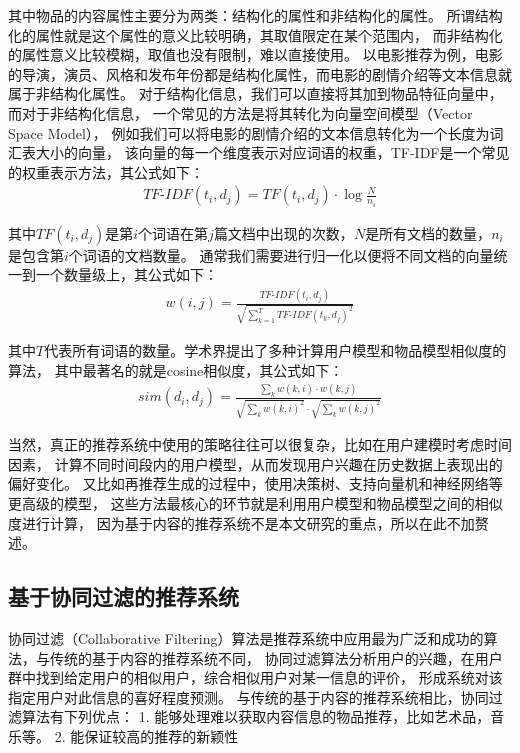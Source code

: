 其中物品的内容属性主要分为两类：结构化的属性和非结构化的属性。
所谓结构化的属性就是这个属性的意义比较明确，其取值限定在某个范围内，
而非结构化的属性意义比较模糊，取值也没有限制，难以直接使用。
以电影推荐为例，电影的导演，演员、风格和发布年份都是结构化属性，而电影的剧情介绍等文本信息就属于非结构化属性。
对于结构化信息，我们可以直接将其加到物品特征向量中，而对于非结构化信息，
一个常见的方法是将其转化为向量空间模型（Vector Space Model），
例如我们可以将电影的剧情介绍的文本信息转化为一个长度为词汇表大小的向量，
该向量的每一个维度表示对应词语的权重，TF-IDF是一个常见的权重表示方法，其公式如下：
\begin{equation}
\begin{split}
TF\textrm{-}IDF(t_i, d_j) = TF(t_i, d_j) \cdot \log{ \frac{N}{n_i} }
\end{split}
\end{equation}

其中$TF(t_i, d_j)$是第$i$个词语在第$j$篇文档中出现的次数，$N$是所有文档的数量，$n_i$是包含第$i$个词语的文档数量。
通常我们需要进行归一化以便将不同文档的向量统一到一个数量级上，其公式如下：
\begin{equation}
\begin{split}
w(i, j) = \frac{ TF\textrm{-}IDF(t_i, d_j) }{ \sqrt{\sum_{k=1}^{T}{TF\textrm{-}IDF(t_k, d_j)^2}} } 
\end{split}
\end{equation}

其中$T$代表所有词语的数量。学术界提出了多种计算用户模型和物品模型相似度的算法，
其中最著名的就是cosine相似度，其公式如下：
\begin{equation}
\begin{split}
sim(d_i, d_j) = \frac{ \sum_k{ w(k, i) \cdot w(k, j) } }
{ \sqrt{\sum_{k}{w(k, i)^2}} \cdot \sqrt{\sum_{k}{w(k, j)^2}} } 
\end{split}
\end{equation}

当然，真正的推荐系统中使用的策略往往可以很复杂，比如在用户建模时考虑时间因素，
计算不同时间段内的用户模型，从而发现用户兴趣在历史数据上表现出的偏好变化。
又比如再推荐生成的过程中，使用决策树、支持向量机和神经网络等更高级的模型，
这些方法最核心的环节就是利用用户模型和物品模型之间的相似度进行计算，
因为基于内容的推荐系统不是本文研究的重点，所以在此不加赘述。

\subsection{基于协同过滤的推荐系统}
协同过滤（Collaborative Filtering）算法是推荐系统中应用最为广泛和成功的算法，与传统的基于内容的推荐系统不同，
协同过滤算法分析用户的兴趣，在用户群中找到给定用户的相似用户，综合相似用户对某一信息的评价，
形成系统对该指定用户对此信息的喜好程度预测。
与传统的基于内容的推荐系统相比，协同过滤算法有下列优点：
1. 能够处理难以获取内容信息的物品推荐，比如艺术品，音乐等。
2. 能保证较高的推荐的新颖性

